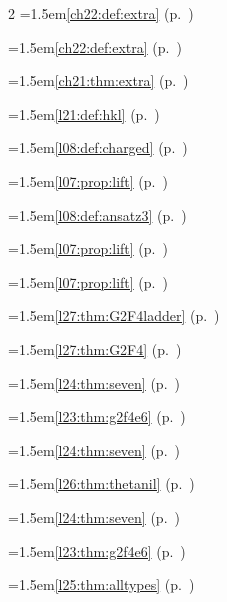 \begin{multicols}{2}
\hangindent=1.5em\quad \ref{ch22:def:extra} (p.~\pageref{ch22:def:extra})\par
\hangindent=1.5em\quad \ref{ch22:def:extra} (p.~\pageref{ch22:def:extra})\par
\hangindent=1.5em\quad \ref{ch21:thm:extra} (p.~\pageref{ch21:thm:extra})\par
\hangindent=1.5em\quad \ref{l21:def:hkl} (p.~\pageref{l21:def:hkl})\par
\par{}\par\nopagebreak\smallskip
\hangindent=1.5em\quad \ref{l08:def:charged} (p.~\pageref{l08:def:charged})\par
\hangindent=1.5em\quad \ref{l07:prop:lift} (p.~\pageref{l07:prop:lift})\par
\hangindent=1.5em\quad \ref{l08:def:ansatz3} (p.~\pageref{l08:def:ansatz3})\par
\hangindent=1.5em\quad \ref{l07:prop:lift} (p.~\pageref{l07:prop:lift})\par
\hangindent=1.5em\quad \ref{l07:prop:lift} (p.~\pageref{l07:prop:lift})\par
\hangindent=1.5em\quad \ref{l27:thm:G2F4ladder} (p.~\pageref{l27:thm:G2F4ladder})\par
\hangindent=1.5em\quad \ref{l27:thm:G2F4} (p.~\pageref{l27:thm:G2F4})\par
\hangindent=1.5em\quad \ref{l24:thm:seven} (p.~\pageref{l24:thm:seven})\par
\hangindent=1.5em\quad \ref{l23:thm:g2f4e6} (p.~\pageref{l23:thm:g2f4e6})\par
\hangindent=1.5em\quad \ref{l24:thm:seven} (p.~\pageref{l24:thm:seven})\par
\hangindent=1.5em\quad \ref{l26:thm:thetanil} (p.~\pageref{l26:thm:thetanil})\par
\hangindent=1.5em\quad \ref{l24:thm:seven} (p.~\pageref{l24:thm:seven})\par
\hangindent=1.5em\quad \ref{l23:thm:g2f4e6} (p.~\pageref{l23:thm:g2f4e6})\par
\hangindent=1.5em\quad \ref{l25:thm:alltypes} (p.~\pageref{l25:thm:alltypes})\par

\end{multicols}
